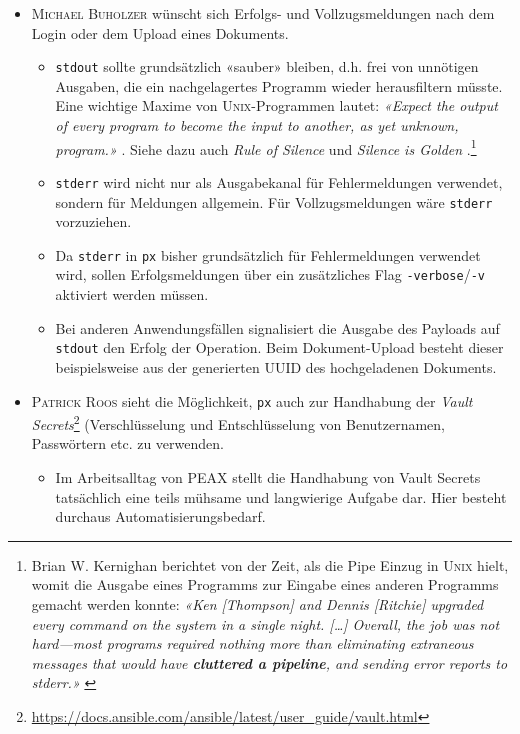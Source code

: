 \begin{itemize}
    \item \textsc{Michael Buholzer} wünscht sich Erfolgs- und Vollzugsmeldungen nach dem Login oder dem Upload eines Dokuments.
    \begin{itemize}
        \item \texttt{stdout} sollte grundsätzlich «sauber» bleiben, d.h. frei von unnötigen Ausgaben, die ein nachgelagertes Programm wieder herausfiltern müsste. Eine wichtige Maxime von \textsc{Unix}-Programmen lautet: \textit{«Expect the output of every program to become the input to another, as yet unknown, program.»} \cite[S. 3]{unixtimesharing}. Siehe dazu auch \textit{Rule of Silence} \cite[S. 20]{unixart} und \textit{Silence is Golden} \cite[S. 111]{unixphil}.\footnote{Brian W. Kernighan berichtet von der Zeit, als die Pipe Einzug in \textsc{Unix} hielt, womit die Ausgabe eines Programms zur Eingabe eines anderen Programms gemacht werden konnte: \textit{«Ken [Thompson] and Dennis [Ritchie] upgraded every command on the system in a single night. […] Overall, the job was not hard—most programs required nothing more than eliminating extraneous messages that would have \textbf{cluttered a pipeline}, and sending error reports to stderr.»} \cite[S. 69]{unix-history-memoir}}
        \item \texttt{stderr} wird nicht nur als Ausgabekanal für Fehlermeldungen verwendet, sondern für Meldungen allgemein. Für Vollzugsmeldungen wäre \texttt{stderr} vorzuziehen.
        \item Da \texttt{stderr} in \texttt{px} bisher grundsätzlich für Fehlermeldungen verwendet wird, sollen Erfolgsmeldungen über ein zusätzliches Flag \texttt{-verbose}/\texttt{-v} aktiviert werden müssen.
        \item Bei anderen Anwendungsfällen signalisiert die Ausgabe des Payloads auf \texttt{stdout} den Erfolg der Operation. Beim Dokument-Upload besteht dieser beispielsweise aus der generierten UUID des hochgeladenen Dokuments.
    \end{itemize}
\item \textsc{Patrick Roos} sieht die Möglichkeit, \texttt{px} auch zur Handhabung der \textit{Vault Secrets}\footnote{\url{https://docs.ansible.com/ansible/latest/user_guide/vault.html}} (Verschlüsselung und Entschlüsselung von Benutzernamen, Passwörtern etc. zu verwenden.
    \begin{itemize}
        \item Im Arbeitsalltag von PEAX stellt die Handhabung von Vault Secrets tatsächlich eine teils mühsame und langwierige Aufgabe dar. Hier besteht durchaus Automatisierungsbedarf.

\end{itemize}
\end{itemize}
